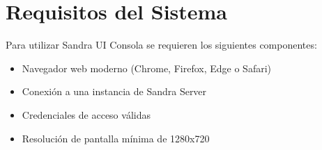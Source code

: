 \section{Requisitos del Sistema}

Para utilizar Sandra UI Consola se requieren los siguientes componentes:

\begin{itemize}
    \item Navegador web moderno (Chrome, Firefox, Edge o Safari)
    \item Conexión a una instancia de Sandra Server
    \item Credenciales de acceso válidas
    \item Resolución de pantalla mínima de 1280x720
\end{itemize}

\clearpage

